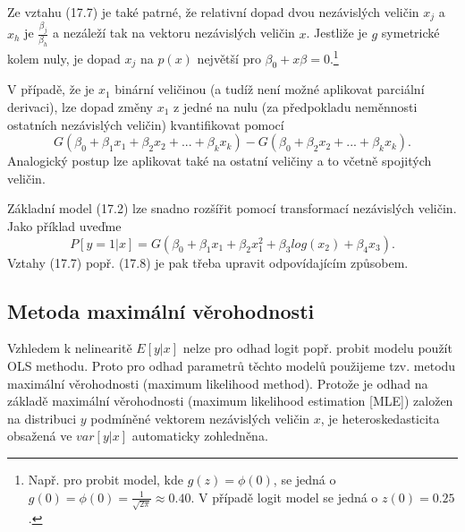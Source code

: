 Ze vztahu (17.7) je také patrné, že relativní dopad  dvou nezávislých veličin $x_j$ a $x_h$ je $\frac{\beta_j}{\beta_h}$ a nezáleží tak na vektoru nezávislých veličin $x$. Jestliže je $g$ symetrické kolem nuly, je dopad $x_j$ na $p(x)$ největší pro $\beta_0 + x \beta = 0$.\footnote{Např. pro probit model, kde $g(z) = \phi(0)$, se jedná o $g(0) = \phi(0) = \frac{1}{\sqrt{2 \pi}} \approx 0.40$. V případě logit model se jedná o $z(0) = 0.25$.}

V případě, že je $x_1$ binární veličinou (a tudíž není možné aplikovat parciální derivaci), lze dopad změny $x_1$ z jedné na nulu (za předpokladu neměnnosti ostatních nezávislých veličin) kvantifikovat pomocí
\begin{equation}
G(\beta_0 + \beta_1 x_1 + \beta_2 x_2 + ... + \beta_k x_k) - G(\beta_0 + \beta_2 x_2 + ... + \beta_k x_k).
\end{equation}
Analogický postup lze aplikovat také na ostatní veličiny a to včetně spojitých veličin.

Základní model (17.2) lze snadno rozšířit pomocí transformací nezávislých veličin. Jako příklad uveďme
\begin{equation}
P[y = 1 | x] = G(\beta_0 + \beta_1 x_1 + \beta_2 x_1^2 + \beta_3 log(x_2) + \beta_4 x_3).
\end{equation}
Vztahy (17.7) popř. (17.8) je pak třeba upravit odpovídajícím způsobem.

\subsection{Metoda maximální věrohodnosti}

Vzhledem k nelinearitě $E[y|x]$ nelze pro odhad logit popř. probit modelu použít OLS methodu. Proto pro odhad parametrů těchto modelů použijeme tzv. metodu maximální věrohodnosti (maximum likelihood method). Protože je odhad na základě maximální věrohodnosti (maximum likelihood estimation [MLE]) založen na distribuci $y$ podmíněné vektorem nezávislých veličin $x$, je heteroskedasticita obsažená ve $var[y|x]$ automaticky zohledněna.

